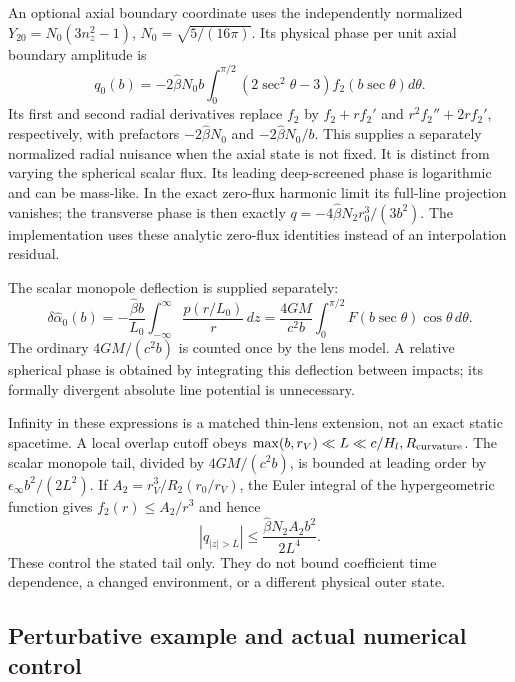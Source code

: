 An optional axial boundary coordinate uses the independently normalized
$Y_{20}=N_0(3n_z^2-1)$, $N_0=\sqrt{5/(16\pi)}$. Its physical phase
per unit axial boundary amplitude is
\begin{equation}
 q_0(b)=-2\widehat\beta N_0b\int_0^{\pi/2}
 (2\sec^2\theta-3)f_2(b\sec\theta)d\theta.
 \label{eq:ext-axial-phase}
\end{equation}
Its first and second radial derivatives replace $f_2$ by $f_2+rf_2'$
and $r^2f_2''+2rf_2'$, respectively, with prefactors
$-2\widehat\beta N_0$ and $-2\widehat\beta N_0/b$.
This supplies a separately normalized radial nuisance when the axial
state is not fixed. It is distinct from varying the spherical scalar
flux. Its leading deep-screened phase is logarithmic and can be
mass-like. In the exact zero-flux harmonic limit its full-line
projection vanishes; the transverse phase is then exactly
$q=-4\widehat\beta N_2r_0^3/(3b^2)$. The implementation uses these
analytic zero-flux identities instead of an interpolation residual.

The scalar monopole deflection is supplied separately:
\begin{equation}
 \delta\widehat\alpha_0(b)
 =-\frac{\widehat\beta b}{L_0}\int_{-\infty}^{\infty}
 \frac{p(r/L_0)}r\,dz
 =\frac{4GM}{c^2b}\int_0^{\pi/2}F(b\sec\theta)\cos\theta\,d\theta.
 \label{eq:ext-monopole-deflection}
\end{equation}
The ordinary $4GM/(c^2b)$ is counted once by the lens model. A relative
spherical phase is obtained by integrating this deflection between
impacts; its formally divergent absolute line potential is unnecessary.

Infinity in these expressions is a matched thin-lens extension, not an
exact static spacetime. A local overlap cutoff obeys
$\max(b,r_V)\ll L\ll c/H_l,R_{\rm curvature}$. The scalar monopole
tail, divided by $4GM/(c^2b)$, is bounded at leading order by
$\epsilon_\infty b^2/(2L^2)$. If
$A_2=r_V^3/R_2(r_0/r_V)$, the Euler integral of the hypergeometric
function gives $f_2(r)\le A_2/r^3$ and hence
\begin{equation}
 |q_{|z|>L}|\le
 \frac{\widehat\beta N_2 A_2 b^2}{2L^4}.
 \label{eq:ext-phase-tail}
\end{equation}
These control the stated tail only. They do not bound coefficient time
dependence, a changed environment, or a different physical outer state.

\subsection{Perturbative example and actual numerical control}

